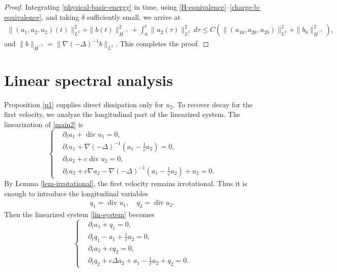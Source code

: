 \documentclass[10pt,reqno]{amsart}
\numberwithin{equation}{section}
\begin{document}
\begin{proof}
Integrating \eqref{physical-basic-energy} in time, using \eqref{H-equivalence}--\eqref{charge-b-equivalence}, and taking $\delta$ sufficiently small, we arrive at
\begin{align*}
 \|(u_1,a_2,u_2)(t)\|_{L^2}^2 +\|b(t)\|_{\dot H^{-1}}^2 +\int_0^t\|u_2(\tau)\|_{L^2}^2\,d\tau \le C\left( \|(u_{10},a_{20}, u_{20})\|_{L^2}^2 +\|b_0\|_{\dot H^{-1}}^2\right),
\end{align*}
and $\|b\|_{\dot H^{-1}}=\|\nabla(-\Delta)^{-1}b\|_{L^2}$. This completes the proof.
\end{proof}


%
%
%
%
%
%

\section{Linear spectral analysis}\label{S4}
Proposition \ref{p1} supplies direct dissipation only for $u_2$. To recover decay for the first velocity, we analyze the longitudinal part of the linearized system. The linearization of \eqref{main2} is
\begin{equation}\label{lin-system}
\left\{
\begin{aligned}
&\partial_t a_1+\operatorname{div}u_1=0,\\
&\partial_t u_1+\nabla(-\Delta)^{-1}\left(a_1-\frac{1}{c}a_2\right)=0,\\
&\partial_t a_2+c\operatorname{div}u_2=0,\\
&\partial_t u_2+c\nabla a_2-\nabla(-\Delta)^{-1}\left(a_1-\frac{1}{c}a_2\right)+u_2=0.
\end{aligned}
\right.
\end{equation}
By Lemma \ref{lem-irrotational}, the first velocity remains
irrotational. Thus it is enough to introduce the longitudinal
variables
\begin{align*}
q_1=\operatorname{div}u_1,\quad q_2=\operatorname{div}u_2.
\end{align*}
Then the linearized system \eqref{lin-system} becomes
\begin{equation}\label{lin-aq}
\left\{
\begin{aligned}
&\partial_t a_1+q_1=0,\\
&\partial_t q_1-a_1+\frac{1}{c}a_2=0,\\
&\partial_t a_2+cq_2=0,\\
&\partial_t q_2+c\Delta a_2+a_1-\frac{1}{c}a_2+q_2=0.
\end{aligned}
\right.
\end{equation}
\end{document}
